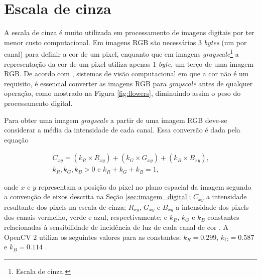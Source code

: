 
\section{Escala de cinza} %
\label{sec:escala_de_cinza}

A escala de cinza é muito utilizada em processamento de imagens digitais por ter menor custo computacional. Em imagens RGB são necessários 3 \textit{bytes} (um por canal) para definir a cor de um pixel, enquanto que em imagens \textit{grayscale}\footnote{Escala de cinza.} a representação da cor de um pixel utiliza apenas 1 \textit{byte}, um terço de uma imagem RGB. De acordo com \cite{woods:2000:book}, sistemas de visão computacional em que a cor não é um requisito, é essencial converter as imagens RGB para \textit{grayscale} antes de qualquer operação, como mostrado na Figura \ref{fig:flowers}, diminuindo assim o peso do processamento digital.

Para obter uma imagem \textit{grayscale} a partir de uma imagem RGB deve-se considerar a média da intensidade de cada canal. Essa conversão é dada pela equação 

\begin{gather}
\label{eq:conversao_cinza}
  C_{xy}=(k_{R}\times R_{xy})+(k_{G}\times G_{xy})+(k_{B}\times B_{xy})\text{,}\\
  \nonumber k_{R}, k_{G}, k_{B} > 0 \text{ e }  k_{R}+k_{G}+k_{B}=1\text{,}
\end{gather}

\noindent onde $x$ e $y$ representam a posição do pixel no plano espacial da imagem segundo a convenção de eixos descrita na Seção \ref{sec:imagem_digital}; $C_{xy}$ a intensidade resultante dos pixels na escala de cinza; $R_{xy}$, $G_{xy}$ e $B_{xy}$ a intensidade dos pixels dos canais vermelho, verde e azul, respectivamente; e $k_{R}$, $k_{G}$ e $k_{B}$ constantes relacionadas à sensibilidade de incidência de luz de cada canal de cor \citep{sjohnson:2006:book}. A OpenCV 2 \citep{opencv_library} utiliza os seguintes valores para as constantes: $k_{R}=0.299$, $k_{G}=0.587$ e $k_{B}=0.114$ \citep{opencv_doc:2013:online}.


